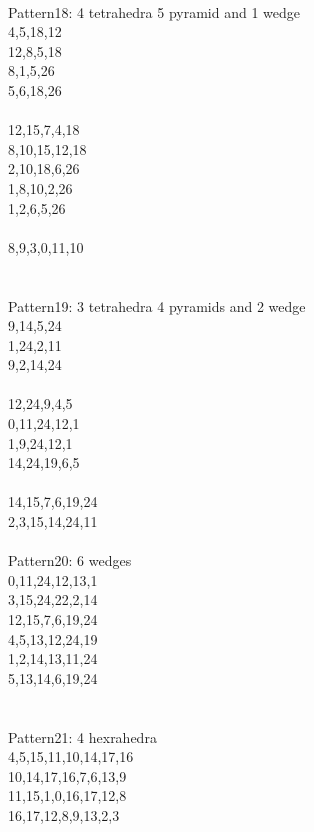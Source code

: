 \documentclass[twocolumn]{article}
\begin{document}
 \\
\tiny  Pattern18: 4 tetrahedra 5 pyramid and 1 wedge\\
\tiny  4,5,18,12\\
\tiny  12,8,5,18 \\
\tiny  8,1,5,26 \\
\tiny  5,6,18,26 \\
\tiny   \\
\tiny  12,15,7,4,18 \\
\tiny  8,10,15,12,18 \\
\tiny  2,10,18,6,26 \\
\tiny  1,8,10,2,26\\
\tiny  1,2,6,5,26\\
\tiny   \\
\tiny  8,9,3,0,11,10 \\
    \\

 \\
\tiny  Pattern19: 3 tetrahedra 4 pyramids and 2 wedge\\
\tiny  9,14,5,24 \\
\tiny  1,24,2,11 \\
\tiny  9,2,14,24 \\
\tiny   \\
\tiny  12,24,9,4,5 \\
\tiny  0,11,24,12,1 \\
\tiny  1,9,24,12,1 \\
\tiny  14,24,19,6,5 \\
\tiny   \\
\tiny  14,15,7,6,19,24 \\
\tiny  2,3,15,14,24,11 \\

 \\
\tiny  Pattern20: 6 wedges\\
\tiny  0,11,24,12,13,1 \\
\tiny  3,15,24,22,2,14  \\
\tiny  12,15,7,6,19,24 \\
\tiny  4,5,13,12,24,19 \\
\tiny  1,2,14,13,11,24 \\
\tiny  5,13,14,6,19,24 \\
\tiny   \\

 \\
\tiny  Pattern21: 4 hexrahedra \\
\tiny  4,5,15,11,10,14,17,16 \\
\tiny  10,14,17,16,7,6,13,9 \\
\tiny  11,15,1,0,16,17,12,8 \\
\tiny  16,17,12,8,9,13,2,3 \\
\tiny   \\
\end{document}
